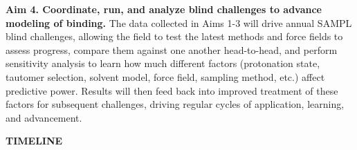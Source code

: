 \documentclass[11pt]{article}
\begin{document}
{\bf Aim 4. Coordinate, run, and analyze blind challenges to advance modeling of binding.}
The data collected in Aims 1-3 will drive annual SAMPL blind challenges, allowing the field to test the latest methods and force fields to assess progress, compare them against one another head-to-head, and perform sensitivity analysis to learn how much different factors (protonation state, tautomer selection, solvent model, force field, sampling method, etc.) affect predictive power. Results will then feed back into improved treatment of these factors for subsequent challenges, driving regular cycles of application, learning, and advancement.




{\bf \large TIMELINE} %



\end{document}
